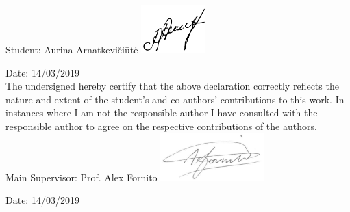 Student: Aurina Arnatkevi\u{c}i\={u}t\.{e}
\includegraphics[height=5em]{AAsignature.png}


Date: 14/03/2019\\

The undersigned hereby certify that the above declaration correctly reflects the nature and extent of the student's and co-authors' contributions to this work. In instances where I am not the responsible author I have consulted with the responsible author to agree on the respective contributions of the authors.\\


Main Supervisor: Prof. Alex Fornito
\includegraphics[height=5em]{AFsignature.pdf}

Date: 14/03/2019\\


